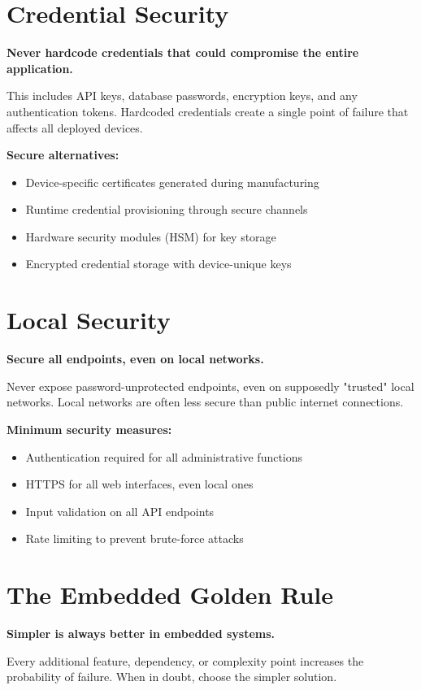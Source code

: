\section{Credential Security}

\textbf{Never hardcode credentials that could compromise the entire application.}

This includes API keys, database passwords, encryption keys, and any authentication tokens. Hardcoded credentials create a single point of failure that affects all deployed devices.

\textbf{Secure alternatives:}
\begin{itemize}
\item Device-specific certificates generated during manufacturing
\item Runtime credential provisioning through secure channels
\item Hardware security modules (HSM) for key storage
\item Encrypted credential storage with device-unique keys
\end{itemize}

\section{Local Security}

\textbf{Secure all endpoints, even on local networks.}

Never expose password-unprotected endpoints, even on supposedly "trusted" local networks. Local networks are often less secure than public internet connections.

\textbf{Minimum security measures:}
\begin{itemize}
\item Authentication required for all administrative functions
\item HTTPS for all web interfaces, even local ones
\item Input validation on all API endpoints
\item Rate limiting to prevent brute-force attacks
\end{itemize}

\section{The Embedded Golden Rule}

\textbf{Simpler is always better in embedded systems.}

Every additional feature, dependency, or complexity point increases the probability of failure. When in doubt, choose the simpler solution.

